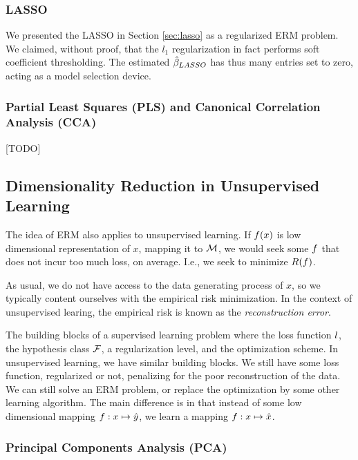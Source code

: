 \subsubsection{LASSO}
We presented the LASSO in Section \ref{sec:lasso} as a regularized ERM problem.
We claimed, without proof, that the $l_1$ regularization in fact performs soft coefficient thresholding. The estimated $\hat{\beta}_{LASSO}$ has thus many entries set to zero, acting as a model selection device. 



\subsubsection{Partial Least Squares (PLS) and Canonical Correlation Analysis (CCA)}
\label{sec:pls}
\label{sec:cca}
[TODO]




\subsection{Dimensionality Reduction in Unsupervised Learning}
\label{sec:dim_reduce_unsupervised}

The idea of ERM also applies to unsupervised learning.
If $f(x)$ is low dimensional representation of $x$, mapping it to $\mathcal{M}$, we would seek some $f$ that does not incur too much loss, on average. I.e., we seek to minimize $R(f)$.

As usual, we do not have access to the data generating process of $x$, so we typically content ourselves with the empirical risk minimization.
In the context of unsupervised learing, the empirical risk is known as the \emph{reconstruction error}.

The building blocks of a supervised learning problem where the loss function $l$, the hypothesis class $\mathcal{F}$, a regularization level, and the optimization scheme.
In unsupervised learning, we have similar building blocks. We still have some loss function, regularized or not, penalizing for the poor reconstruction of the data. We can still solve an ERM problem, or replace the optimization by some other learning algorithm. The main difference is in that instead of some low dimensional mapping $f:x \mapsto \hat{y}$, we learn a mapping  $f:x \mapsto \hat{x}$.





\subsubsection{Principal Components Analysis (PCA)}
\label{sec:pca}

